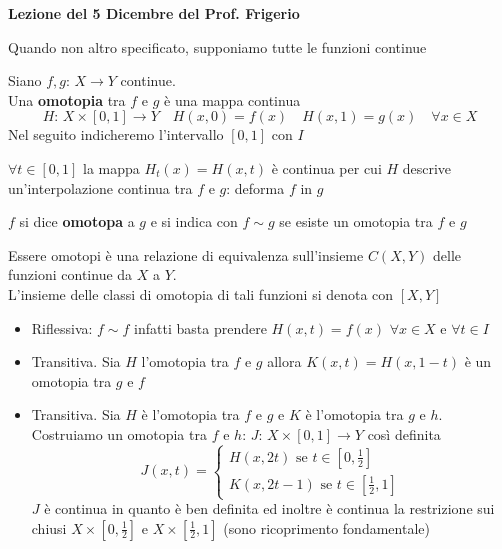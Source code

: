 

\textbf{Lezione del 5 Dicembre del Prof. Frigerio}
\begin{oss}Quando non altro specificato, supponiamo tutte le funzioni continue
\end{oss}
\begin{defn}Siano $f,g:\, X \to Y$ continue.\\
Una \textbf{ omotopia } tra $f$ e $g$ \`e una mappa continua 
$$ H:\, X \times [0,1]\to Y \quad H(x,0)=f(x) \quad  H(x,1)=g(x)\quad \forall x\in X $$
Nel seguito indicheremo l'intervallo $[0,1]$ con $I$
\end{defn}
\begin{oss}$\forall t\in [0,1]$ la mappa $H_t(x)=H(x,t)$ \`e continua per cui $H$ descrive un'interpolazione continua tra $f$ e $g$: deforma $f$ in $g$
\end{oss}
\begin{defn}$f$ si dice \textbf{ omotopa } a $g$  e si indica con $f \sim g$ se esiste un  omotopia tra $f$ e $g$
 \end{defn}
 \begin{prop}Essere omotopi \`e una relazione di equivalenza sull'insieme $C(X,Y)$ delle funzioni continue da $X$ a $Y$.\\
 L'insieme delle classi di omotopia di tali funzioni si denota con $[X,Y]$
 \proof \bbianco
 \begin{itemize}
 \item Riflessiva: $f \sim f$ infatti basta prendere $H(x,t)=f(x)$ $\forall x \in X$ e $\forall t\in I$ 
 \item Transitiva. Sia $H$ l'omotopia tra $f$ e $g$ allora $K(x,t)=H(x,1-t)$ \`e un omotopia tra $g$ e $f$
 \item Transitiva. Sia $H$ \`e l'omotopia tra $f$ e $g$ e $K$ \`e l'omotopia tra $g$ e $h$.\\
 Costruiamo un omotopia tra $f$ e $h$: $J:\, X \times [0,1] \to Y$ cos\`i definita 
 $$ J(x,t)= \begin{cases} H(x,2t) \text{ se } t \in \left[ 0, \frac{1}{2} \right] \\
 K(x,2t-1) \text{ se } t \in \left[ \frac{1}{2},1 \right]
 \end{cases}$$
 $J$ \`e continua in quanto \`e ben definita ed inoltre \`e continua la restrizione sui chiusi $X\times \left[ 0, \frac{1}{2} \right]$ e $ X\times \left[ \frac{1}{2},1 \right]$ (sono ricoprimento fondamentale)
 \end{itemize}
\endproof
 \end{prop}
